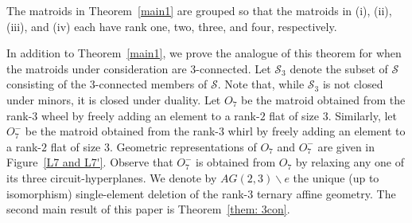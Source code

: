 \documentclass[11pt]{amsart}
\numberwithin{equation}{section} %
\newcommand{\cS}{\mathcal{S}}
\begin{document}
\noindent The matroids in Theorem~\ref{main1} are grouped so that the matroids in (i), (ii), (iii), and (iv) each have rank one, two, three, and four, respectively.
	
In addition to Theorem~\ref{main1}, we prove the analogue of this theorem for when the matroids under consideration are $3$-connected. Let $\cS_3$ denote the subset of $\cS$ consisting of the $3$-connected members of $\cS$. Note that, while $\cS_3$ is not closed under minors, it is closed under duality. Let $O_7$ be the matroid obtained from the rank-$3$ wheel by freely adding an element to a rank-$2$ flat of size $3$. Similarly, let $O_7^-$ be the matroid obtained from the rank-$3$ whirl by freely adding an element to a rank-$2$ flat of size $3$. Geometric representations of $O_7$ and $O_7^-$ are given in Figure~\ref{L7 and L7'}. Observe that $O_7^-$ is obtained from $O_7$ by relaxing any one of its three circuit-hyperplanes. We denote by $AG(2, 3)\backslash e$ the unique (up to isomorphism) single-element deletion of the rank-$3$ ternary affine geometry. The second main result of this paper is Theorem~\ref{them: 3con}.
\end{document}
